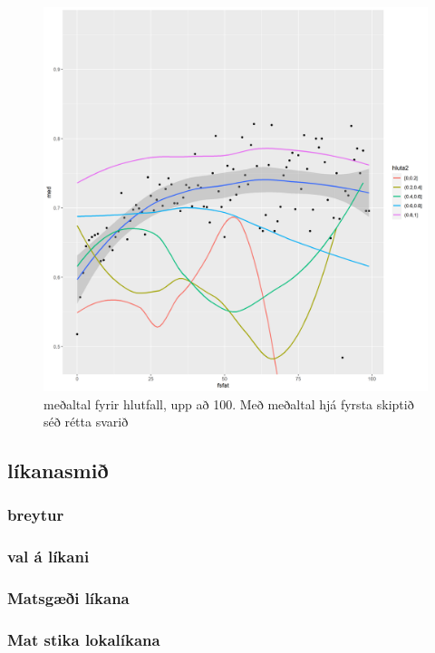 \documentclass[
  12pt,
]{article}
\begin{document}
\begin{figure}[H]

{\centering \includegraphics[width=1\linewidth]{Img/meabwhsbyhlutfall100} 

}

\caption{meðaltal fyrir hlutfall, upp að 100. Með meðaltal hjá fyrsta skiptið séð rétta svarið}\label{fig:meanbyhlutfallandhsta100}
\end{figure}

\hypertarget{luxedkanasmiuxf0}{%
\subsection{líkanasmið}\label{luxedkanasmiuxf0}}

\hypertarget{breytur-1}{%
\subsubsection{breytur}\label{breytur-1}}

\hypertarget{val-uxe1-luxedkani}{%
\subsubsection{val á líkani}\label{val-uxe1-luxedkani}}

\hypertarget{matsguxe6uxf0i-luxedkana}{%
\subsubsection{Matsgæði líkana}\label{matsguxe6uxf0i-luxedkana}}

\hypertarget{mat-stika-lokaluxedkana}{%
\subsubsection{Mat stika lokalíkana}\label{mat-stika-lokaluxedkana}}
\end{document}
